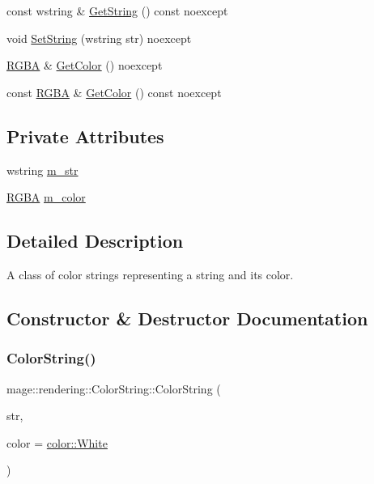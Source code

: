 \begin{DoxyCompactItemize}
\item 
const wstring \& \hyperlink{classmage_1_1rendering_1_1_color_string_a146cf063553b65b3cd854417b638b533}{Get\+String} () const noexcept
\item 
void \hyperlink{classmage_1_1rendering_1_1_color_string_aefee43f68f87617976f89430bac71fba}{Set\+String} (wstring str) noexcept
\item 
\hyperlink{structmage_1_1_r_g_b_a}{R\+G\+BA} \& \hyperlink{classmage_1_1rendering_1_1_color_string_a396ed7da3f3b27068b05c1ead9816046}{Get\+Color} () noexcept
\item 
const \hyperlink{structmage_1_1_r_g_b_a}{R\+G\+BA} \& \hyperlink{classmage_1_1rendering_1_1_color_string_a08bd67511180f15e902ce34dd402fe82}{Get\+Color} () const noexcept
\end{DoxyCompactItemize}
\subsection*{Private Attributes}
\begin{DoxyCompactItemize}
\item 
wstring \hyperlink{classmage_1_1rendering_1_1_color_string_a226202625fbe205d78e1412310a49f1f}{m\+\_\+str}
\item 
\hyperlink{structmage_1_1_r_g_b_a}{R\+G\+BA} \hyperlink{classmage_1_1rendering_1_1_color_string_a6b062bfa44b3786c5e8f2e8d18a373ca}{m\+\_\+color}
\end{DoxyCompactItemize}


\subsection{Detailed Description}
A class of color strings representing a string and its color. 

\subsection{Constructor \& Destructor Documentation}
\hypertarget{classmage_1_1rendering_1_1_color_string_af574d1a87d78ed0315f4f6279cd167ae}{}\label{classmage_1_1rendering_1_1_color_string_af574d1a87d78ed0315f4f6279cd167ae} 
\subsubsection{\texorpdfstring{Color\+String()}{ColorString()}\hspace{0.1cm}{\footnotesize\ttfamily [1/3]}}
{\footnotesize\ttfamily mage\+::rendering\+::\+Color\+String\+::\+Color\+String (\begin{DoxyParamCaption}\item[{wstring}]{str,  }\item[{\hyperlink{structmage_1_1_r_g_b_a}{R\+G\+BA}}]{color = {\ttfamily \hyperlink{namespacemage_1_1color_a39aae61faf172a41b44e2d308e1e4da6}{color\+::\+White}} }\end{DoxyParamCaption})\hspace{0.3cm}{\ttfamily [noexcept]}}


